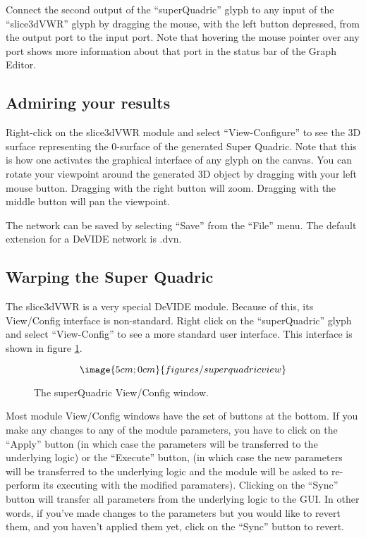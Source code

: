 Connect the second output of the ``superQuadric'' glyph to any input
of the ``slice3dVWR'' glyph by dragging the mouse, with the left
button depressed, from the output port to the input port.  Note that
hovering the mouse pointer over any port shows more information about
that port in the status bar of the Graph Editor.

\subsection{Admiring your results}
Right-click on the slice3dVWR module and select ``View-Configure'' to
see the 3D surface representing the 0-surface of the generated Super
Quadric.  Note that this is how one activates the graphical interface
of any glyph on the canvas.  You can rotate your viewpoint around the
generated 3D object by dragging with your left mouse button.  Dragging
with the right button will zoom.  Dragging with the middle button will
pan the viewpoint.

The network can be saved by selecting ``Save'' from the ``File''
menu.  The default extension for a DeVIDE network is .dvn.

\subsection{Warping the Super Quadric}
The slice3dVWR is a very special DeVIDE module.  Because of this, its
View/Config interface is non-standard.  Right click on the
``superQuadric'' glyph and select ``View-Config'' to see a more
standard user interface.  This interface is shown in figure
\ref{figSuperQuadricView}.

\begin{figure}
$$\image{5cm;0cm}{figures/superquadricview}$$
\caption{The superQuadric View/Config window.}\label{figSuperQuadricView}
\end{figure}

Most module View/Config windows have the set of buttons at the
bottom.  If you make any changes to any of the module parameters, you
have to click on the ``Apply'' button (in which case the parameters
will be transferred to the underlying logic) or the ``Execute''
button, (in which case the new parameters will be transferred to the
underlying logic and the module will be asked to re-perform its
executing with the modified paramaters).  Clicking on the ``Sync''
button will transfer all parameters from the underlying logic to the
GUI.  In other words, if you've made changes to the parameters but you
would like to revert them, and you haven't applied them yet, click on
the ``Sync'' button to revert.

